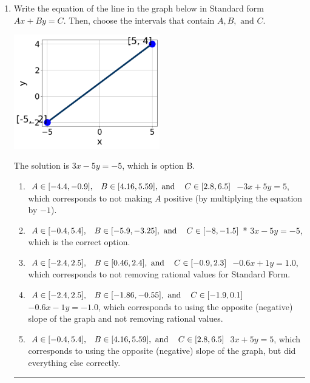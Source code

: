 \documentclass{extbook}[14pt]
\newcommand{\litem}[1]{\item#1\hspace*{-1cm}\rule{\textwidth}{0.4pt}}
\begin{document}
\begin{enumerate}\litem{
Write the equation of the line in the graph below in Standard form $Ax+By=C$. Then, choose the intervals that contain $A, B, \text{ and } C$.

\begin{center}
    \includegraphics[width=0.5\textwidth]{../Figures/linearGraphToStandardC.png}
\end{center}

The solution is \( 3x - 5y = -5 \), which is option B.\begin{enumerate}[label=\Alph*.]
\item \( A \in [-4.4, -0.9], \hspace{3mm} B \in [4.16, 5.59], \text{ and } \hspace{3mm} C \in [2.8, 6.5] \) $-3x + 5y = 5$, which corresponds to not making $A$ positive (by multiplying the equation by $-1$).
\item \( A \in [-0.4, 5.4], \hspace{3mm} B \in [-5.9, -3.25], \text{ and } \hspace{3mm} C \in [-8, -1.5] \)* $3x - 5y = -5$, which is the correct option.
\item \( A \in [-2.4, 2.5], \hspace{3mm} B \in [0.46, 2.4], \text{ and } \hspace{3mm} C \in [-0.9, 2.3] \) $-0.6x + 1y = 1.0$, which corresponds to not removing rational values for Standard Form.
\item \( A \in [-2.4, 2.5], \hspace{3mm} B \in [-1.86, -0.55], \text{ and } \hspace{3mm} C \in [-1.9, 0.1] \) $-0.6x - 1y = -1.0$, which corresponds to using the opposite (negative) slope of the graph and not removing rational values.
\item \( A \in [-0.4, 5.4], \hspace{3mm} B \in [4.16, 5.59], \text{ and } \hspace{3mm} C \in [2.8, 6.5] \) $3x + 5y = 5$, which corresponds to using the opposite (negative) slope of the graph, but did everything else correctly.
\end{enumerate}

}
\end{enumerate}
\end{document}
